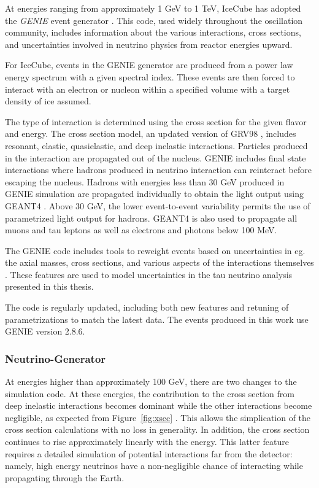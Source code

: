 At energies ranging from approximately 1 GeV to 1 TeV, IceCube has adopted the \emph{GENIE} event generator \cite{GENIE}.
This code, used widely throughout the oscillation community, includes information about the various interactions, cross sections, and uncertainties involved in neutrino physics from reactor energies upward.

For IceCube, events in the GENIE generator are produced from a power law energy spectrum with a given spectral index.
These events are then forced to interact with an electron or nucleon within a specified volume with a target density of ice assumed.

The type of interaction is determined using the cross section for the given flavor and energy.
The cross section model, an updated version of GRV98 \cite{GRV98}, includes resonant, elastic, quasielastic, and deep inelastic interactions.
Particles produced in the interaction are propagated out of the nucleus.
GENIE includes final state interactions where hadrons produced in neutrino interaction can reinteract before escaping the nucleus.
Hadrons with energies less than 30 GeV produced in GENIE simulation are propagated individually to obtain the light output using GEANT4 \cite{GEANT4-1,GEANT4-2}.
Above 30 GeV, the lower event-to-event variability permits the use of parametrized light output for hadrons.
GEANT4 is also used to propagate all muons and tau leptons as well as electrons and photons below 100 MeV.

The GENIE code includes tools to reweight events based on uncertainties in eg. the axial masses, cross sections, and various aspects of the interactions themselves \cite{GENIE}. 
These features are used to model uncertainties in the tau neutrino analysis presented in this thesis.

The code is regularly updated, including both new features and retuning of parametrizations to match the latest data.
The events produced in this work use GENIE version 2.8.6.

\subsubsection{Neutrino-Generator}
\label{subsubsec:nugen}
At energies higher than approximately 100 GeV, there are two changes to the simulation code.
At these energies, the contribution to the cross section from deep inelastic interactions becomes dominant while the other interactions become negligible, as expected from Figure~\ref{fig:xsec} \cite{Formaggio-Xsec}. 
This allows the simplication of the cross section calculations with no loss in generality.
In addition, the cross section continues to rise approximately linearly with the energy.
This latter feature requires a detailed simulation of potential interactions far from the detector: namely, high energy neutrinos have a non-negligible chance of interacting while propagating through the Earth.

